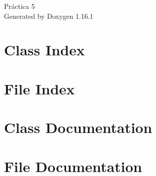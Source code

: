 \documentclass[twoside]{book}
\newcommand{\+}{\discretionary{\mbox{\scriptsize$\hookleftarrow$}}{}{}}
\newcommand{\clearemptydoublepage}{%
    \newpage{\pagestyle{empty}\cleardoublepage}%
  }
\begin{document}
  \raggedbottom
    \hypersetup{pageanchor=false,
                bookmarksnumbered=true,
                pdfencoding=unicode
               }
  \begin{titlepage}
  \vspace*{7cm}
  \begin{center}%
  {\Large Práctica 5}\\
  \vspace*{1cm}
  {\large Generated by Doxygen 1.16.1}\\
  \end{center}
  \end{titlepage}
  \clearemptydoublepage
  \tableofcontents
  \clearemptydoublepage
  \hypersetup{pageanchor=true}

\chapter{Class Index}

\chapter{File Index}

\chapter{Class Documentation}








\chapter{File Documentation}









  \backmatter
  \newpage
  \clearemptydoublepage
  \printindex
\end{document}
